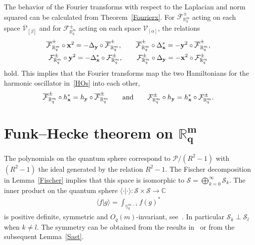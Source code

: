 \documentclass[pdftex]{sigma}
\newcommand{\mR}{\mathbb{R}}
\newcommand{\mC}{\mathbb{C}}
\newcommand{\mS}{\mathbb{S}}
\newcommand{\cF}{\mathcal{F}}
\newcommand{\cP}{\mathcal{P}}
\newcommand{\cS}{\mathcal{S}}
\newcommand{\cV}{\mathcal{V}}
\numberwithin{equation}{section}
\begin{document}
The behavior of the Fourier transforms with respect to the Laplacian and norm squared can be calculated from Theorem~\ref{Fourierx}. For $\overline{\cF}^{\pm}_{\mR^m_q}$ acting on each space $\overline{\cV}_{[\beta]}$ and for ${\cF}^{\pm}_{\mR^m_q}$ acting on each space ${\cV}_{[\alpha]}$, the relations
\begin{gather*}
\overline{\cF}_{\mR^m_q}^{\pm}\circ \bold{x}^2=-\Delta_{\bold{y}}\circ\overline{\cF}_{\mR^m_q}^{\pm} ,\qquad \overline{\cF}_{\mR^m_q}^{\pm}\circ {\Delta}^\ast_{\bold{x}}=-\bold{y}^2\circ\overline{\cF}_{\mR^m_q}^{\pm},\\
\cF_{\mR^m_q}^{\pm}\circ \bold{y}^2=-{\Delta}^\ast_{\bold{x}}\circ\cF_{\mR^m_q}^{\pm}, \qquad %
\cF_{\mR^m_q}^{\pm}\circ {\Delta_{\bold{y}}}=-\bold{x}^2\circ\cF_{\mR^m_q}^{\pm}
\end{gather*}
hold. This implies that the Fourier transforms map the two Hamiltonians for the harmonic oscillator in~\eqref{HOs} into each other,
\begin{gather}
\label{fourham}
\overline{\cF}_{\mR^m_q}^{\pm}\circ {h}^\ast_{\bold{x}}=h_{\bold{y}}\circ\overline{\cF}_{\mR^m_q}^{\pm} \qquad \mbox{and} \qquad \cF_{\mR^m_q}^{\pm}\circ h_{\bold{y}}={h}^\ast_{\bold{x}}\circ\cF_{\mR^m_q}^{\pm}.
\end{gather}

\section[Funk-Hecke theorem on $\mR^m_q$]{Funk--Hecke theorem on $\boldsymbol{\mR^m_q}$}


The polynomials on the quantum sphere correspond to $\cP/(R^2-1)$ with $(R^2-1)$ the ideal generated by the relation $R^2-1$. The Fischer decomposition in Lemma~\ref{Fischer} implies that this space is isomorphic to $\cS=\bigoplus_{k=0}^\infty\cS_k$. The inner product on the quantum sphere $\langle \cdot|\cdot\rangle:\cS\times\cS\to\mC$
\begin{gather}
\label{inSymm}
\langle f|g\rangle=\int_{\mS^{m-1}_q}f(g)^\ast
\end{gather}
is positive def\/inite, symmetric and $O_q(m)$-invariant, see~\cite[Proposition~14]{MR1328733}. In particular $\cS_k\perp \cS_l$ when $k\not=l$. The symmetry can be obtained from the results in~\cite{MR1239953} or from the subsequent Lemma~\ref{Sast}.
\end{document}
